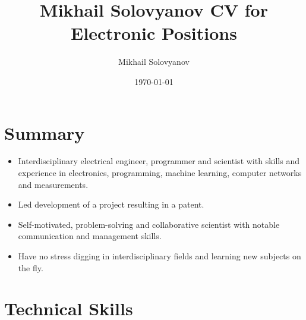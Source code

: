 \documentclass{article}
\title{ Mikhail Solovyanov CV for Electronic Positions}
\author{Mikhail Solovyanov}
\date{\today}
\begin{document}
 
\makecvtitle %
 
\section{Summary}
\begin{itemize}
\item Interdisciplinary electrical engineer, programmer and scientist with skills and experience in electronics, programming, machine learning, computer networks and measurements.
\item Led development of a  project resulting in a patent.
\item Self-motivated, problem-solving and collaborative scientist with notable communication and management skills.
\item Have no stress digging in interdisciplinary fields and learning new subjects on the fly.
\end{itemize}





\section{Technical Skills}
 
\end{document}
